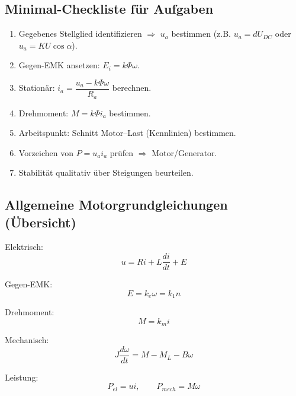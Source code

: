 \subsection{Minimal-Checkliste für Aufgaben}

\begin{enumerate}
    \item Gegebenes Stellglied identifizieren $\Rightarrow$ $u_a$ bestimmen (z.B. $u_a=dU_{DC}$ oder $u_a=K U\cos\alpha$).
    \item Gegen-EMK ansetzen: $E_i=k\Phi\omega$.
    \item Stationär: $i_a = \dfrac{u_a-k\Phi\omega}{R_a}$ berechnen.
    \item Drehmoment: $M=k\Phi i_a$ bestimmen.
    \item Arbeitspunkt: Schnitt Motor--Last (Kennlinien) bestimmen.
    \item Vorzeichen von $P=u_ai_a$ prüfen $\Rightarrow$ Motor/Generator.
    \item Stabilität qualitativ über Steigungen beurteilen.
\end{enumerate}

\subsection{Allgemeine Motorgrundgleichungen (Übersicht)}

Elektrisch:
\[
\boxed{u = R i + L\frac{di}{dt} + E}
\]

Gegen-EMK:
\[
\boxed{E = k_e \omega = k_1 n}
\]

Drehmoment:
\[
\boxed{M = k_m i}
\]

Mechanisch:
\[
\boxed{J\frac{d\omega}{dt} = M - M_L - B\omega}
\]

Leistung:
\[
\boxed{P_{el}=u i,\qquad P_{mech}=M\omega}
\]

